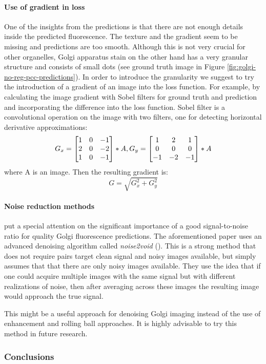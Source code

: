        \paragraph{Use of gradient in loss}
            One of the insights from the predictions is that there are not enough details inside the predicted fluorescence. The texture and the gradient seem to be missing and predictions are too smooth. Although this is not very crucial for other organelles, Golgi apparatus stain on the other hand has a very granular structure and consists of small dots (see ground truth image in Figure \ref{fig:golgi-no-reg-pcc-predictions}). In order to introduce the granularity we suggest to try the introduction of a gradient of an image into the loss function. For example, by calculating the image gradient with Sobel filters for ground truth and prediction and incorporating the difference into the loss function. Sobel filter is a convolutional operation on the image with two filters, one for detecting horizontal derivative approximations:
            \begin{equation}
                G_x = \begin{bmatrix}
                    1 & 0 & -1\\
                    2 & 0 & -2\\
                    1 & 0 & -1
                    \end{bmatrix} * A, \smallskip
                G_y = \begin{bmatrix}
                    1 & 2 & 1\\
                    0 & 0 & 0\\
                    -1 & -2 & -1
                \end{bmatrix} * A
            \end{equation}
            where A is an image. Then the resulting gradient is:
            \begin{equation}
                G = \sqrt{G_x^2 + G_y^2}
            \end{equation}
        \paragraph{Noise reduction methods}
            \cite{Cheng_2021} put a special attention on the significant importance of a good signal-to-noise ratio for quality Golgi fluorescence predictions. The aforementioned paper uses an advanced denoising algorithm called \textit{noise2void} (\cite{noise2void}). This is a strong method that does not require pairs target clean signal and noisy images available, but simply assumes that that there are only noisy images available. They use the idea that if one could acquire multiple images with the same signal but with different realizations of noise, then after averaging across these images the resulting image would approach the true signal. 

            This might be a useful approach for denoising Golgi imaging instead of the use of enhancement and rolling ball approaches. It is highly advisable to try this method in future research.

    \subsubsection{Conclusions}
        